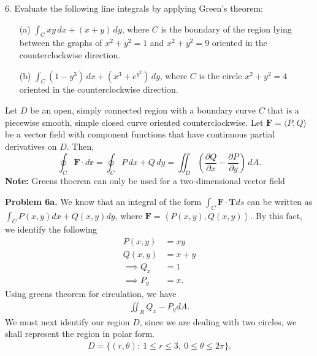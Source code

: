 \documentclass{report}
\begin{document}
    \bigbreak \noindent 
    \begin{mdframed}
        6. Evaluate the following line integrals by applying Green's theorem:
        \begin{enumerate}
            \item[(a)] \(\int_C xy \, dx + (x + y) \, dy\), where \(C\) is the boundary of the region lying between the graphs of \(x^2 + y^2 = 1\) and \(x^2 + y^2 = 9\) oriented in the counterclockwise direction.
            \item[(b)] \(\int_C (1 - y^3) \, dx + (x^3 + e^{y^2}) \, dy\), where \(C\) is the circle \(x^2 + y^2 = 4\) oriented in the counterclockwise direction.
        \end{enumerate}
    \end{mdframed}
    \bigbreak \noindent 
    \begin{remark}
        Let \( D \) be an open, simply connected region with a boundary curve \( C \) that is a piecewise smooth, simple closed curve oriented counterclockwise. Let \( \mathbf{F} = \langle P, Q \rangle \) be a vector field with component functions that have continuous partial derivatives on \( D \). Then,
        \[
            \oint_C \mathbf{F} \cdot d\mathbf{r} = \oint_C P \, dx + Q \, dy = \iint_D \left( \frac{\partial Q}{\partial x} - \frac{\partial P}{\partial y} \right) \, dA.
        \]
        \bigbreak \noindent 
        \textbf{Note:} Greens thoerem can only be used for a two-dimensional vector field
    \end{remark}
    \bigbreak \noindent 
    \textbf{Problem 6a.}
    \bigbreak \noindent 
    We know that an integral of the form $\int_C \mathbf{F} \cdot \mathbf{T}ds$ can be written as $\int_C P(x,y)dx + Q(x,y)dy$, where $\mathbf{F} = \left\langle P(x,y), Q(x,y)\right\rangle $. By this fact, we identify the following
    \begin{align*}
        P(x,y) &= xy \\
        Q(x,y) &= x+y \\
        \implies Q_{x} &= 1 \\
        \implies P_{y} &= x
    .\end{align*}
    \bigbreak \noindent 
    Using greens theorem for circulation, we have
    \begin{align*}
        \iint_R Q_{x} - P_{y}dA
    .\end{align*}
    \bigbreak \noindent 
    We must next identify our region $D$, since we are dealing with two circles, we shall represent the region in polar form.
    \begin{align*}
        D = \{(r,\theta ):\ 1 \leq r \leq 3,\ 0 \leq \theta  \leq 2\pi\} 
    .\end{align*}
\end{document}
